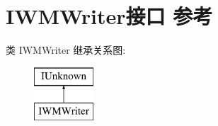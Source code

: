 \hypertarget{interface_i_w_m_writer}{}\section{I\+W\+M\+Writer接口 参考}
\label{interface_i_w_m_writer}
类 I\+W\+M\+Writer 继承关系图\+:\begin{figure}[H]
\begin{center}
\leavevmode
\includegraphics[height=2.000000cm]{interface_i_w_m_writer}
\end{center}
\end{figure}
